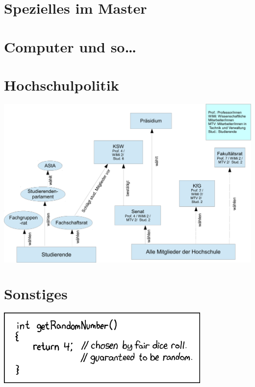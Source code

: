 \documentclass[
]{papertex}
\begin{document}
	\section{Spezielles im Master}
		\label{master}
		
	\newpage

	\section{Computer und so\ldots}
		\label{computer}
		
	\newpage

	\section{Hochschulpolitik}
		\label{politik}
		\begin{minipage}[H]{1.0\linewidth}
		\begin{center}
			\centering
			\includegraphics[width=\textwidth]{bilder/gremienkunde/gremienkunde3}
		\end{center}
		\end{minipage}
		\vspace{0.5cm}
		
		\begin{multicols}{2}
		
		
		\end{multicols}
	\newpage

	\section{Sonstiges}
		\label{sonstiges}
		\begin{center}
		\includegraphics[totalheight=3cm]{bilder/XKCD/random_number}
		\end{center}
		\begin{multicols}{2}
		
		
		\end{multicols}
		\newpage
		
		\newpage
		
\end{document}
